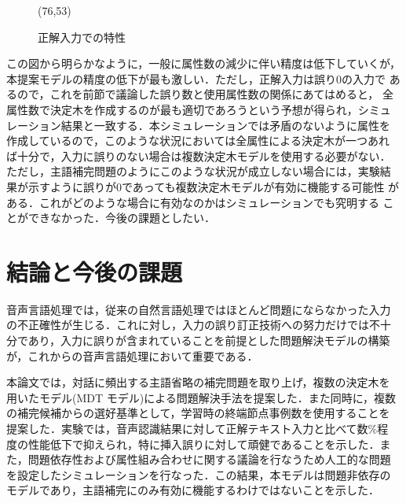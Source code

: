 \begin{figure}
\begin{center}
    \begin{epsf}
    \end{epsf}
    \begin{draft}
    \atari(76,53)
    \end{draft}
\vspace{1mm}
\caption{正解入力での特性}
\label{図:正解入力}
\end{center}
\end{figure}

この図から明らかなように，一般に属性数の減少に伴い精度は低下していくが，
本提案モデルの精度の低下が最も激しい．ただし，正解入力は誤り0の入力で
あるので，これを前節で議論した誤り数と使用属性数の関係にあてはめると，
全属性数で決定木を作成するのが最も適切であろうという予想が得られ，シミュ
レーション結果と一致する．本シミュレーションでは矛盾のないように属性を
作成しているので，このような状況においては全属性による決定木が一つあれ
ば十分で，入力に誤りのない場合は複数決定木モデルを使用する必要がない．
ただし，主語補完問題のようにこのような状況が成立しない場合には，実験結
果が示すように誤りが0であっても複数決定木モデルが有効に機能する可能性
がある．これがどのような場合に有効なのかはシミュレーションでも究明する
ことができなかった．今後の課題としたい．



\section{結論と今後の課題}

音声言語処理では，従来の自然言語処理ではほとんど問題にならなかった入力
の不正確性が生じる．これに対し，入力の誤り訂正技術への努力だけでは不十
分であり，入力に誤りが含まれていることを前提とした問題解決モデルの構築
が，これからの音声言語処理において重要である．

本論文では，対話に頻出する主語省略の補完問題を取り上げ，複数の決定木を
用いたモデル(MDT モデル)による問題解決手法を提案した．また同時に，複数
の補完候補からの選好基準として，学習時の終端節点事例数を使用することを
提案した．実験では，音声認識結果に対して正解テキスト入力と比べて数\%程
度の性能低下で抑えられ，特に挿入誤りに対して頑健であることを示した．ま
た，問題依存性および属性組み合わせに関する議論を行なうため人工的な問題
を設定したシミュレーションを行なった．この結果，本モデルは問題非依存の
モデルであり，主語補完にのみ有効に機能するわけではないことを示した．

